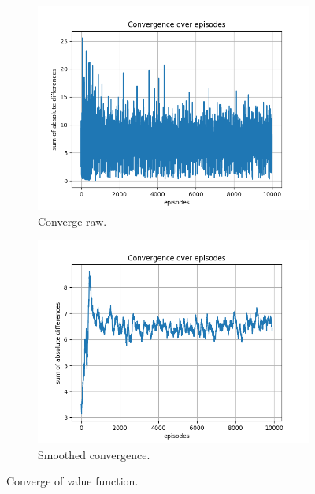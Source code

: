 \documentclass{assignment}
\begin{document}
\begin{figure}[H]
    \begin{subfigure}{0.5\textwidth}
        \includegraphics[width=\textwidth]{figures/convergence_q/epsilon_sweep/convergence_Q_alpha_0.1_gamma_0.95_epislon_0.5.png}
    \caption{Converge raw.}
    \end{subfigure}\hfill
    \begin{subfigure}{0.5\textwidth}
        \includegraphics[width=\textwidth]{figures/convergence_q/epsilon_sweep/convergence_Q_smoothed_alpha_0.1_gamma_0.95_epislon_0.5.png}
    \caption{Smoothed convergence.}
    \end{subfigure}
    \caption{Converge of value function.}
    \label{fig:epsilon_0.5_q_learning_convergence}
\end{figure}
\end{document}
